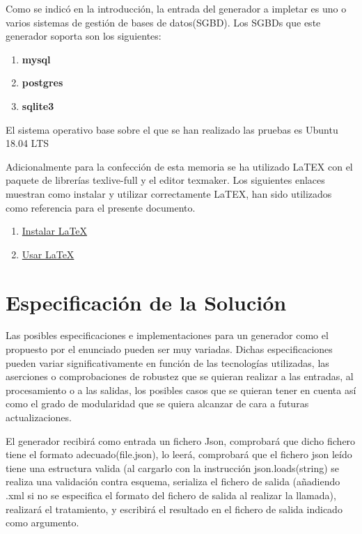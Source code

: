\documentclass[a4paper,11pt]{book}
\begin{document}
Como se indicó en la introducción, la entrada del generador a impletar es uno o varios sistemas de gestión de bases de datos(SGBD). Los SGBDs que este generador soporta son los siguientes:

\begin{enumerate}
\item \textbf{mysql}
\item \textbf{postgres}
\item \textbf{sqlite3}
\end{enumerate}
 
El sistema operativo base sobre el que se han realizado las pruebas es Ubuntu 18.04 LTS

Adicionalmente para la confección de esta memoria se ha utilizado LaTEX con el paquete de librerías texlive-full y el editor texmaker. Los siguientes enlaces muestran como instalar y utilizar correctamente LaTEX, han sido utilizados como referencia para el presente documento. 

\begin{enumerate}
\item \href{http://milq.github.io/install-latex-ubuntu-debian/}{Instalar LaTeX}
\item \href{ http://minisconlatex.blogspot.com.es/}{Usar LaTeX}
\end{enumerate}
 
 



\section{Especificación de la Solución}

Las posibles especificaciones e implementaciones para un generador como el propuesto por el enunciado pueden ser muy variadas. Dichas especificaciones pueden variar significativamente en función de las tecnologías utilizadas, las aserciones o comprobaciones de robustez que se quieran realizar a las entradas, al procesamiento o a las salidas, los posibles casos que se quieran tener en cuenta así como el grado de modularidad que se quiera alcanzar de cara a futuras actualizaciones.


El generador recibirá como entrada un fichero Json, comprobará que dicho fichero tiene el formato adecuado(file.json), lo leerá, comprobará que el fichero json leído tiene una estructura valida (al cargarlo con la instrucción json.loads(string) se realiza una validación contra esquema, serializa el fichero de salida (añadiendo .xml si no se especifica el formato del fichero de salida al realizar la llamada), realizará el tratamiento, y escribirá el resultado en el fichero de salida indicado como argumento. 
\end{document}
